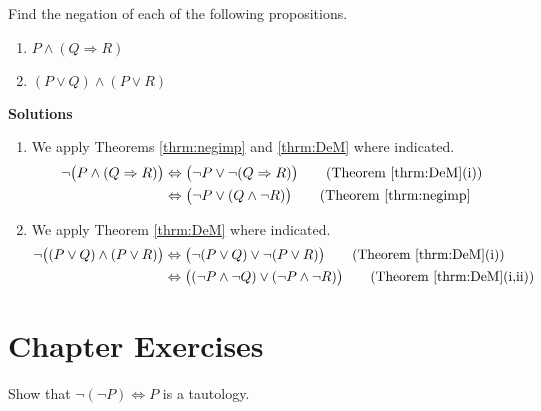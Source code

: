 \begin{example}
Find the negation of each of the following propositions.
\begin{enumerate}\itemsep0pt
\item $P\land(Q\Rightarrow R)$
\item $(P\lor Q) \land (P\lor R)$
\end{enumerate}
{\bfseries\upshape Solutions}
\begin{enumerate}\itemsep0pt
\item We apply Theorems \ref{thrm:negimp} and \ref{thrm:DeM} where indicated.
\begin{equation*}\begin{split}
\neg\bigl( P\land (Q\Rightarrow R)\bigr) &\Leftrightarrow \bigl(\neg P \lor \neg(Q\Rightarrow R)\bigr) \qquad \text{(Theorem \ref{thrm:DeM}(i))}\\
&\Leftrightarrow\bigl( \neg P \lor(Q\land\neg R) \bigr) \qquad\text{(Theorem \ref{thrm:negimp}}\\
\end{split}\end{equation*}
\item We apply Theorem \ref{thrm:DeM} where indicated.
\begin{equation*}\begin{split}
\neg\bigl( (P\lor Q) \land (P\lor R)\bigr) &\Leftrightarrow \bigl( \neg(P\lor Q) \lor \neg(P\lor R)\bigr) \qquad\text{(Theorem \ref{thrm:DeM}(i))}\\
&\Leftrightarrow\bigl( (\neg P \land\neg Q) \lor (\neg P\land\neg R)\bigr) \qquad\text{(Theorem \ref{thrm:DeM}(i,ii))}\\
\end{split}\end{equation*}
\end{enumerate}
\end{example}

\clearpage

\section*{Chapter  Exercises}

\begin{exercise}\label{exer:dblneg}
Show that $\neg(\neg P)\Leftrightarrow P$ is a tautology.
\end{exercise}

